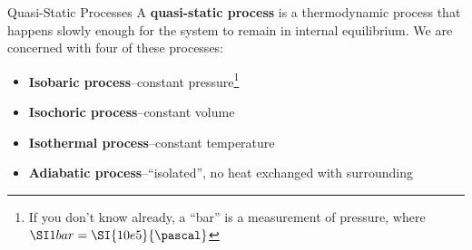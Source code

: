\documentclass[12pt,aspectratio=169,dvipsnames]{beamer}
\begin{document}
\begin{frame}{Quasi-Static Processes}
  A \textbf{quasi-static process} is a thermodynamic process that happens
  slowly enough for the system to remain in internal equilibrium. We are
  concerned with four of these processes:
  \begin{itemize}
  \item\textbf{Isobaric process}--constant pressure\footnote{If you don't know
  already, a ``bar'' is a measurement of pressure, where
  $\SI1{bar}=\SI{10e5}{\pascal}$}
  \item\textbf{Isochoric process}--constant volume
  \item\textbf{Isothermal process}--constant temperature
  \item\textbf{Adiabatic process}--``isolated'', no heat exchanged with
    surrounding
  \end{itemize}
\end{frame}
\end{document}
